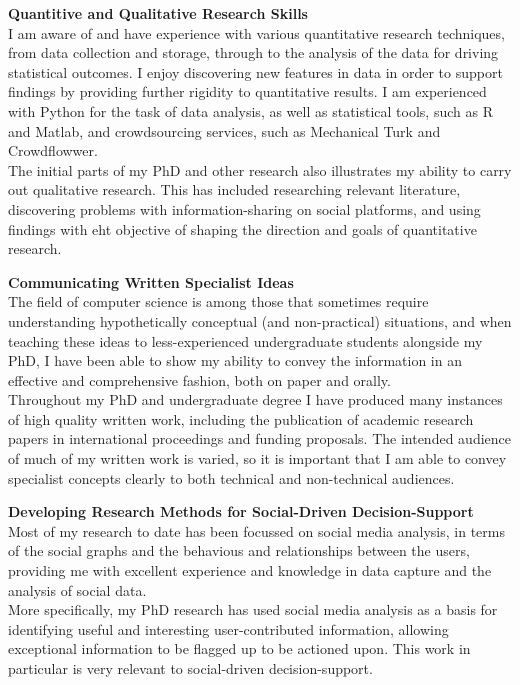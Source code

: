 \documentclass[11pt,a4paper]{article}
\begin{document}
\textbf{Quantitive and Qualitative Research Skills}\\
I am aware of and have experience with various quantitative research techniques, from data collection and storage, through to the analysis of the data for driving statistical outcomes. I enjoy discovering new features in data in order to support findings by providing further rigidity to quantitative results. I am experienced with Python for the task of data analysis, as well as statistical tools, such as R and Matlab, and crowdsourcing services, such as Mechanical Turk and Crowdflowwer.\\
The initial parts of my PhD and other research also illustrates my ability to carry out qualitative research. This has included researching relevant literature, discovering problems with information-sharing on social platforms, and using findings with eht objective of shaping the direction and goals of quantitative research. 

\textbf{Communicating Written Specialist Ideas}\\
The field of computer science is among those that sometimes require understanding hypothetically conceptual (and non-practical) situations, and when teaching these ideas to less-experienced undergraduate students alongside my PhD, I have been able to show my ability to convey the information in an effective and comprehensive fashion, both on paper and orally.\\
Throughout my PhD and undergraduate degree I have produced many instances of high quality written work, including the publication of academic research papers in international proceedings and funding proposals. The intended audience of much of my written work is varied, so it is important that I am able to convey specialist concepts clearly to both technical and non-technical audiences.

\textbf{Developing Research Methods for Social-Driven Decision-Support}\\
Most of my research to date has been focussed on social media analysis, in terms of the social graphs and the behavious and relationships between the users, providing me with excellent experience and knowledge in data capture and the analysis of social data.\\
More specifically, my PhD research has used social media analysis as a basis for identifying useful and interesting user-contributed information, allowing exceptional information to be flagged up to be actioned upon. This work in particular is very relevant to social-driven decision-support. 
\end{document}
